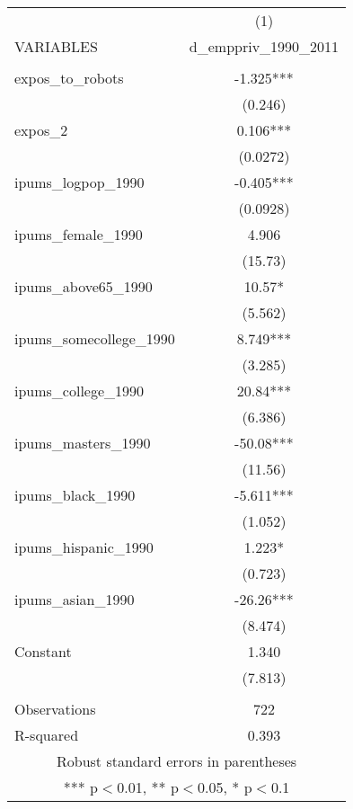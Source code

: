 \documentclass[]{article}
\begin{document}
\begin{tabular}{lc} \hline
 & (1) \\
VARIABLES & d\_emppriv\_1990\_2011 \\ \hline
 &  \\
expos\_to\_robots & -1.325*** \\
 & (0.246) \\
expos\_2 & 0.106*** \\
 & (0.0272) \\
ipums\_logpop\_1990 & -0.405*** \\
 & (0.0928) \\
ipums\_female\_1990 & 4.906 \\
 & (15.73) \\
ipums\_above65\_1990 & 10.57* \\
 & (5.562) \\
ipums\_somecollege\_1990 & 8.749*** \\
 & (3.285) \\
ipums\_college\_1990 & 20.84*** \\
 & (6.386) \\
ipums\_masters\_1990 & -50.08*** \\
 & (11.56) \\
ipums\_black\_1990 & -5.611*** \\
 & (1.052) \\
ipums\_hispanic\_1990 & 1.223* \\
 & (0.723) \\
ipums\_asian\_1990 & -26.26*** \\
 & (8.474) \\
Constant & 1.340 \\
 & (7.813) \\
 &  \\
Observations & 722 \\
 R-squared & 0.393 \\ \hline
\multicolumn{2}{c}{ Robust standard errors in parentheses} \\
\multicolumn{2}{c}{ *** p$<$0.01, ** p$<$0.05, * p$<$0.1} \\
\end{tabular}
\end{document}
